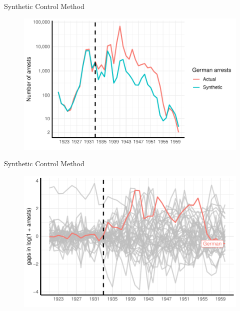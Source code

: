 \documentclass[11pt]{beamer}
\begin{document}
\begin{frame}{Synthetic Control Method}
 \begin{figure}[h]
\centering
\includegraphics[width=1\textwidth]{comparison_plot_scaled.pdf}
\label{fig:sc_comp_plot}
\end{figure}
\end{frame}



\begin{frame}{Synthetic Control Method}
 \begin{figure}[h]
\centering
\includegraphics[width=1\textwidth]{placebo_highlight_all_imp_date.pdf}
\label{fig:sc_placebo_gaps_all}
\end{figure}
\end{frame}
\end{document}
